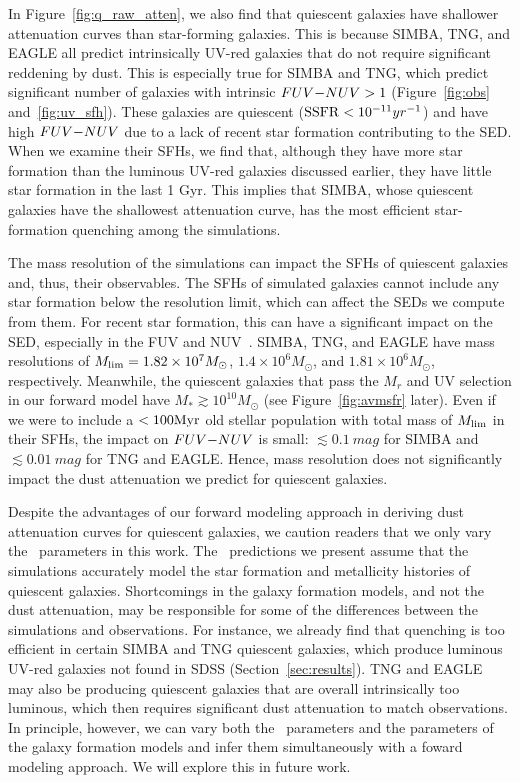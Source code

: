 In Figure~\ref{fig:q_raw_atten}, we also find that quiescent galaxies have
shallower attenuation curves than star-forming galaxies. 
This is because SIMBA, TNG, and EAGLE all predict intrinsically UV-red galaxies
that do not require significant reddening by dust. 
This is especially true for SIMBA and TNG, which predict significant
number of galaxies with intrinsic $FUV{-}NUV > 1$ (Figure~\ref{fig:obs}
and~\ref{fig:uv_sfh}).
These galaxies are quiescent (${\rm SSFR} < 10^{-11}yr^{-1}$) and have high
$FUV{-}NUV$ due to a lack of recent star formation contributing to the
SED.
When we examine their SFHs, we find that, although they have more star
formation than the luminous UV-red galaxies discussed earlier, they have
little star formation in the last 1 Gyr. 
This implies that SIMBA, whose quiescent galaxies have the shallowest
attenuation curve, has the most efficient star-formation quenching among
the simulations. 

The mass resolution of the simulations can impact the SFHs of quiescent
galaxies and, thus, their observables.
The SFHs of simulated galaxies cannot include any star formation below the
resolution limit, which can affect the SEDs we compute from them. 
For recent star formation, this can have a significant impact on the SED,
especially in the FUV and NUV~\citep{leja2017}. 
SIMBA, TNG, and EAGLE have mass resolutions of $M_{\rm lim} = 1.82\times10^7M_\odot$, 
$1.4\times10^{6}M_\odot$, and $1.81\times10^6M_\odot$, respectively.
Meanwhile, the quiescent galaxies that pass the $M_r$ and UV selection
in our forward model have $M_* \gtrsim 10^{10}M_\odot$ (see Figure~\ref{fig:avmsfr} later). 
Even if we were to include a $< 100{\rm Myr}$ old stellar population
with total mass of $M_{\rm lim}$ in their SFHs, the impact on $FUV{-}NUV$ is small:
$\lesssim 0.1~mag$ for SIMBA and $\lesssim 0.01~mag$ for TNG and EAGLE.
Hence, mass resolution does not significantly impact the dust attenuation
we predict for quiescent galaxies.  

Despite the advantages of our forward modeling approach in deriving dust
attenuation curves for quiescent galaxies, we caution readers
that we only vary the \eda~parameters in this work.     
The \eda~predictions we present assume that the simulations accurately model
the star formation and metallicity histories of quiescent galaxies. 
Shortcomings in the galaxy formation models, and not the dust attenuation, may
be responsible for some of the differences between the simulations and
observations. 
For instance, we already find that quenching is too efficient in certain SIMBA
and TNG quiescent galaxies, which produce luminous UV-red galaxies not found in
SDSS (Section~\ref{sec:results}). 
TNG and EAGLE may also be producing quiescent galaxies that are
overall intrinsically too luminous, which then requires significant dust
attenuation to match observations.
In principle, however, we can vary both the \eda~parameters and the parameters
of the galaxy formation models and infer them simultaneously with a foward
modeling approach. 
We will explore this in future work. 
